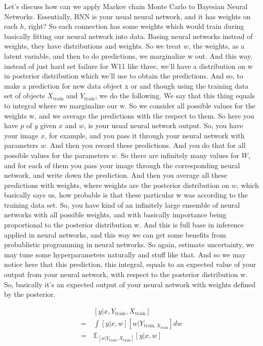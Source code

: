 \documentclass[11pt, oneside, reqno]{amsart}
\numberwithin{equation}{section}
\theoremstyle{plain}%
\theoremstyle{definition}
\theoremstyle{remark}
\newcommand{\E}{\mathbb{E}}
\begin{document}
Let's discuss how can we apply Markov chain Monte Carlo to Bayesian Neural Networks. Essentially, BNN  is your usual neural network, and it has weights on each $h$, right? So each connection has some weights which would train during basically fitting our neural network into data. Basing neural networks instead of weights, they have distributions and weights. So we treat $w$, the weights, as a latent variable, and then to do predictions, we marginalize w out. And this way, instead of just hard set failure for W11 like three, we'll have a distribution on w in posterior distribution which we'll use to obtain the predictions. And so, to make a prediction for new data object x or and though using the training data set of objects $X_\text{train}$ and $Y_\text{train}$, we do the following. We say that this thing equals to integral where we marginalize our w. So we consider all possible values for the weights w, and we average the predictions with the respect to them. So here you have $p$ of $y$ given $x$ and $w$, is your usual neural network output. So, you have your image $x$, for example, and you pass it through your neural network with parameters $w$. And then you record these predictions. And you do that for all possible values for the parameters $w$. So there are infinitely many values for $W$, and for each of them you pass your image through the corresponding neural network, and write down the prediction. And then you average all these predictions with weights, where weights are the posterior distribution on $w$, which basically says us, how probable is that these particular w was according to the training data set. So, you have kind of an infinitely large ensemble of neural networks with all possible weights, and with basically importance being proportional to the posterior distribution w. And this is full base in inference applied in neural networks, and this way we can get some benefits from probablistic programming in neural networks. So again, estimate uncertainty, we may tune some hyperparameters naturally and stuff like that. And so we may notice here that this prediction, this integral, equals to an expected value of your output from your neural network, with respect to the posterior distribution w. So, basically it's an expected output of your neural network with weights defined by the posterior.

\begin{align*}
&\	[y|x,Y_{\text{train}},X_{\text{train}}]\\
= &\ \int [y|x,w] [w|Y_{\text{train},X_{\text{train}}}]dw\\
= &\ \E_{[w|Y_{\text{train}},X_{\text{train}}]} [y|x,w]
\end{align*}
\end{document}
